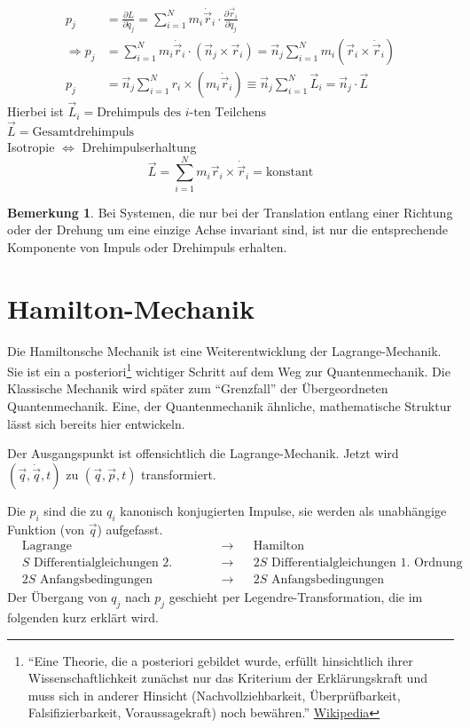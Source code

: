 \documentclass[oneside]{book}
\theoremstyle{definition}
\newtheorem*{bemerkung*}{Bemerkung}
\newcommand{\dotvec}[1]{\dot{\vec{#1}}}
\newcommand{\const}{\text{konstant}}
\begin{document}
\begin{align*}
	p_j &= \frac{\partial L}{\partial \dot q_j} = \sum\limits_{i=1}^Nm_i \dot {\vec r}_i \cdot \frac{\partial \vec r_i}{\partial q_j}\\
	\Rightarrow p_j &= \sum\limits_{i=1}^N m_i \dot {\vec r}_i \cdot (\vec n_j \times \vec r_i) = \vec n_j \sum\limits_{i=1}^N m_i (\vec r_i \times \dot {\vec r}_i)\\
	p_j &= \vec n_j \sum\limits_{i=1}^N r_i \times (m_i\dot{\vec r}_i) \equiv \vec n_j \sum\limits_{i=1}^N \vec L_i = \vec n_j \cdot \vec L
\end{align*}
Hierbei ist
$\vec L_i = \text{Drehimpuls des $i$-ten Teilchens}$\\
$\vec L = \text{Gesamtdrehimpuls}$\\
Isotropie  $\Leftrightarrow$ Drehimpulserhaltung
\[\vec L = \sum\limits_{i=1}^Nm_i \vec r_i \times \dotvec r_i = \const \]
\begin{bemerkung*}
	Bei Systemen, die nur bei der Translation entlang einer Richtung oder der Drehung um eine einzige Achse invariant sind, ist nur die entsprechende Komponente von Impuls oder Drehimpuls erhalten.
\end{bemerkung*}

\section{Hamilton-Mechanik}
Die Hamiltonsche Mechanik ist eine Weiterentwicklung der Lagrange-Mechanik. Sie ist ein a posteriori\footnote{"`Eine Theorie, die a posteriori gebildet wurde, erfüllt hinsichtlich ihrer Wissenschaftlichkeit zunächst nur das Kriterium der Erklärungskraft und muss sich in anderer Hinsicht (Nachvollziehbarkeit, Überprüfbarkeit, Falsifizierbarkeit, Voraussagekraft) noch bewähren."' \href{https://de.wikipedia.org/wiki/A_posteriori}{Wikipedia}} wichtiger Schritt auf dem Weg zur Quantenmechanik. Die Klassische Mechanik wird später zum "`Grenzfall"' der Übergeordneten Quantenmechanik. Eine, der Quantenmechanik ähnliche, mathematische Struktur lässt sich bereits hier entwickeln.

Der Ausgangspunkt ist offensichtlich die Lagrange-Mechanik. Jetzt wird $(\vec q, \dot {\vec q}, t)$ zu $(\vec q, \vec p, t)$ transformiert.

Die $p_i$ sind die zu $q_i$ kanonisch konjugierten Impulse, sie werden als unabhängige Funktion (von $\vec q$) aufgefasst.
\begin{align*}
&\text{Lagrange} &\to& &\text{Hamilton}\\
&\text{$S$ Differentialgleichungen 2. Ordnung} &\to& &\text{$2S$ Differentialgleichungen 1. Ordnung}\\
&\text{$2S$ Anfangsbedingungen} &\to& &\text{$2S$ Anfangsbedingungen}
\end{align*}
Der Übergang von $q_j$ nach $p_j$ geschieht per Legendre-Transformation, die im folgenden kurz erklärt wird.
\end{document}
